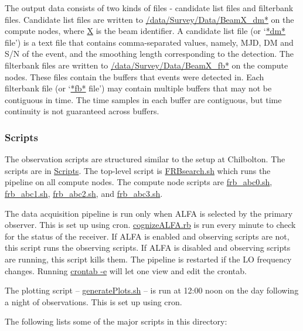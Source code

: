 \documentclass{article}
\begin{document}
The output data consists of two kinds of files - candidate list files and
filterbank files. Candidate list files are written to
\url{/data/Survey/Data/BeamX_dm*} on the compute nodes, where \url{X} is the
beam identifier. A candidate list file (or `\url{*dm*} file') is a text file
that contains comma-separated values, namely, MJD, DM and S/N of the event, and
the smoothing length corresponding to the detection. The filterbank files are
written to \url{/data/Survey/Data/BeamX_fb*} on the compute nodes. These files
contain the buffers that events were detected in. Each filterbank file (or
`\url{*fb*} file') may contain multiple buffers that may not be contiguous in
time. The time samples in each buffer are contiguous, but time continuity is
not guaranteed across buffers.


\subsubsection{Scripts}

The observation scripts are structured similar to the setup at Chilbolton. The
scripts are in \url{Scripts}. The top-level script is \url{FRBsearch.sh} which
runs the pipeline on all compute nodes. The compute node scripts are
\url{frb_abc0.sh}, \url{frb_abc1.sh}, \url{frb_abc2.sh}, and \url{frb_abc3.sh}.

The data acquisition pipeline is run only when ALFA is selected by the primary
observer. This is set up using cron. \url{cognizeALFA.rb} is run every minute
to check for the status of the receiver. If ALFA is enabled and observing
scripts are not, this script runs the observing scripts. If ALFA is disabled
and observing scripts are running, this script kills them. The pipeline is
restarted if the LO frequency changes. Running \url{crontab -e} will let one
view and edit the crontab.

The plotting script -- \url{generatePlots.sh} -- is run at 12:00 noon on the
day following a night of observations. This is set up using cron.

The following lists some of the major scripts in this directory:
\end{document}
